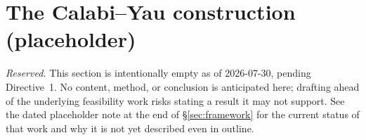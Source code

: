 \section{The Calabi--Yau construction (placeholder)}
\label{sec:cy-construction}

\emph{Reserved.} This section is intentionally empty as of 2026-07-30,
pending Directive~1. No content, method, or conclusion is anticipated here;
drafting ahead of the underlying feasibility work risks stating a result it
may not support. See the dated placeholder note at the end of
\S\ref{sec:framework} for the current status of that work and why it is not
yet described even in outline.

